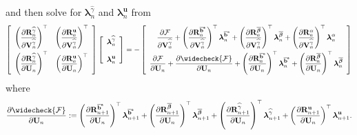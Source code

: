 \documentclass[preprint,11pt]{elsarticle}
\theoremstyle{definition}
\begin{document}
and then solve for $\boldsymbol{\lambda}_n^{\widehat{\gamma}}$ and $\boldsymbol{\lambda}_n^\mathbf{u}$ from 
\begin{equation} \label{Reduced Adjoint Equation at Remaining Steps}
    \left[ \begin{array}{cc}
        \left( \dfrac{\partial \mathbf{R}_n^{\widehat{\gamma}}}{\partial \mathbf{V}_n^{\widehat{\gamma}}} \right)^\top
        & \left( \dfrac{\partial \mathbf{R}_n^\mathbf{u}}{\partial \mathbf{V}_n^{\widehat{\gamma}}} \right)^\top \\[12pt]
        \left( \dfrac{\partial \mathbf{R}_n^{\widehat{\gamma}}}{\partial \mathbf{U}_n} \right)^\top
        & \left( \dfrac{\partial \mathbf{R}_n^\mathbf{u}}{\partial \mathbf{U}_n} \right)^\top
    \end{array} \right]
    \left[ \begin{array}{c}
        \boldsymbol{\lambda}_n^{\widehat{\gamma}} \\[12pt]
        \boldsymbol{\lambda}_n^\mathbf{u}
    \end{array} \right]
    = - \left[ \begin{array}{c}
         \dfrac{\partial \mathcal{F}}{\partial \mathbf{V}_n^{\widehat{\gamma}}}
         + \left( \dfrac{\partial \mathbf{R}_n^{\overline{\mathbf{b}}^\texttt{e}}}{\partial \mathbf{V}_n^{\widehat{\gamma}}} \right)^\top \boldsymbol{\lambda}_n^{\overline{\mathbf{b}}^\texttt{e}}
         + \left( \dfrac{\partial \mathbf{R}_n^{\overline{\boldsymbol{\beta}}}}{\partial \mathbf{V}_n^{\widehat{\gamma}}} \right)^\top \boldsymbol{\lambda}_n^{\overline{\boldsymbol{\beta}}}
         + \left( \dfrac{\partial \mathbf{R}_n^\alpha}{\partial \mathbf{V}_n^{\widehat{\gamma}}} \right)^\top \boldsymbol{\lambda}_n^\alpha \\[12pt]
         \dfrac{\partial \mathcal{F}}{\partial \mathbf{U}_n}
         + \dfrac{\partial \widecheck{\mathcal{F}}}{\partial \mathbf{U}_n}
         + \left( \dfrac{\partial \mathbf{R}_n^{\overline{\mathbf{b}}^\texttt{e}}}{\partial \mathbf{U}_n} \right)^\top \boldsymbol{\lambda}_n^{\overline{\mathbf{b}}^\texttt{e}}
         + \left( \dfrac{\partial \mathbf{R}_n^{\overline{\boldsymbol{\beta}}}}{\partial \mathbf{U}_n} \right)^\top \boldsymbol{\lambda}_n^{\overline{\boldsymbol{\beta}}}
    \end{array} \right]
\end{equation}
where
\begin{equation*}
    \dfrac{\partial \widecheck{\mathcal{F}}}{\partial \mathbf{U}_n}
    := \left( \dfrac{\partial \mathbf{R}_{n+1}^{\overline{\mathbf{b}}^\texttt{e}}}{\partial \mathbf{U}_n} \right)^\top \boldsymbol{\lambda}_{n+1}^{\overline{\mathbf{b}}^\texttt{e}}
    + \left( \dfrac{\partial \mathbf{R}_{n+1}^{\overline{\boldsymbol{\beta}}}}{\partial \mathbf{U}_n} \right)^\top \boldsymbol{\lambda}_{n+1}^{\overline{\boldsymbol{\beta}}}
    + \left( \dfrac{\partial \mathbf{R}_{n+1}^{\widehat{\gamma}}}{\partial \mathbf{U}_n} \right)^\top  \boldsymbol{\lambda}_{n+1}^{\widehat{\gamma}}
    + \left( \dfrac{\partial \mathbf{R}_{n+1}^\mathbf{u}}{\partial \mathbf{U}_n} \right)^\top \boldsymbol{\lambda}_{n+1}^\mathbf{u}.
\end{equation*}
\end{document}
